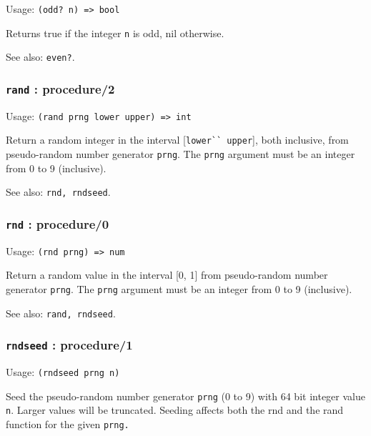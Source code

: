 \documentclass[
]{article}
\newcommand{\passthrough}[1]{#1}
\begin{document}
Usage: \passthrough{\lstinline!(odd? n) => bool!}

Returns true if the integer \passthrough{\lstinline!n!} is odd, nil
otherwise.

See also: \passthrough{\lstinline!even?!}.

\hypertarget{rand-procedure2}{%
\subsubsection{\texorpdfstring{\texttt{rand} :
procedure/2}{rand : procedure/2}}\label{rand-procedure2}}

Usage: \passthrough{\lstinline!(rand prng lower upper) => int!}

Return a random integer in the interval
{[}\passthrough{\lstinline!lower`` upper!}{]}, both inclusive, from
pseudo-random number generator \passthrough{\lstinline!prng!}. The
\passthrough{\lstinline!prng!} argument must be an integer from 0 to 9
(inclusive).

See also: \passthrough{\lstinline!rnd, rndseed!}.

\hypertarget{rnd-procedure0}{%
\subsubsection{\texorpdfstring{\texttt{rnd} :
procedure/0}{rnd : procedure/0}}\label{rnd-procedure0}}

Usage: \passthrough{\lstinline!(rnd prng) => num!}

Return a random value in the interval {[}0, 1{]} from pseudo-random
number generator \passthrough{\lstinline!prng!}. The
\passthrough{\lstinline!prng!} argument must be an integer from 0 to 9
(inclusive).

See also: \passthrough{\lstinline!rand, rndseed!}.

\hypertarget{rndseed-procedure1}{%
\subsubsection{\texorpdfstring{\texttt{rndseed} :
procedure/1}{rndseed : procedure/1}}\label{rndseed-procedure1}}

Usage: \passthrough{\lstinline!(rndseed prng n)!}

Seed the pseudo-random number generator \passthrough{\lstinline!prng!}
(0 to 9) with 64 bit integer value \passthrough{\lstinline!n!}. Larger
values will be truncated. Seeding affects both the rnd and the rand
function for the given \passthrough{\lstinline!prng.!}
\end{document}

